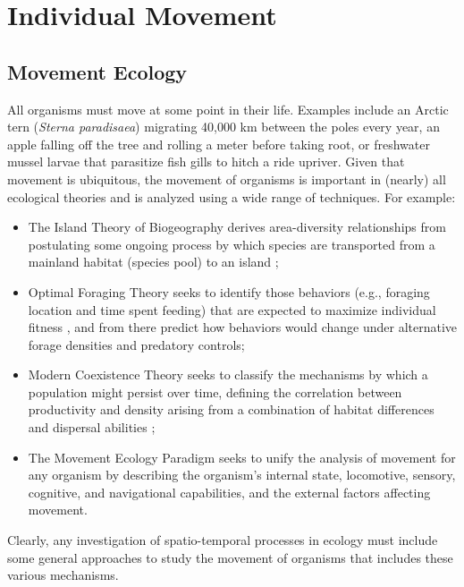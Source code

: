 \chapter{Individual Movement} \label{sec:Chap4_movement}

\section{Movement Ecology} \label{sec:Chap4_movement_ecology}

All organisms must move at some point in their life. Examples include an Arctic tern (\textit{Sterna paradisaea}) migrating 40,000 km between the poles every year, an apple falling off the tree and rolling a meter before taking root, or freshwater mussel larvae that parasitize fish gills to hitch a ride upriver.  Given that movement is ubiquitous, the movement of organisms is important in (nearly) all ecological theories and is analyzed using a wide range of techniques.  For example:
\begin{itemize}
    \item The Island Theory of Biogeography derives area-diversity relationships from postulating some ongoing process by which species are transported from a mainland habitat (species pool) to an island \cite{macarthur_theory_1967};
 
    \item Optimal Foraging Theory seeks to identify those behaviors (e.g., foraging location and time spent feeding) that are expected to maximize individual fitness \cite{krebs_optimal_1978}, and from there predict how behaviors would change under alternative forage densities and predatory controls;
 
    \item Modern Coexistence Theory seeks to classify the mechanisms by which a population might persist over time, defining the correlation between productivity and density arising from a combination of habitat differences and dispersal abilities \cite{chesson_mechanisms_2000};

    \item The Movement Ecology Paradigm \cite{nathan_movement_2008} seeks to unify the analysis of movement for any organism by describing the organism's internal state, locomotive, sensory, cognitive, and navigational capabilities, and the external factors affecting movement.  
\end{itemize}
Clearly, any investigation of spatio-temporal processes in ecology must include some general approaches to study the movement of organisms that includes these various mechanisms.


